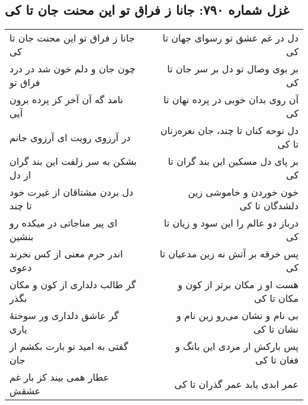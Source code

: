 \begin{center}
\section*{غزل شماره ۷۹۰: جانا ز فراق تو این محنت جان تا کی}
\label{sec:790}
\begin{longtable}{l p{0.5cm} r}
جانا ز فراق تو این محنت جان تا کی
&&
دل در غم عشق تو رسوای جهان تا کی
\\
چون جان و دلم خون شد در درد فراق تو
&&
بر بوی وصال تو دل بر سر جان تا کی
\\
نامد گه آن آخر کز پرده برون آیی
&&
آن روی بدان خوبی در پرده نهان تا کی
\\
در آرزوی رویت ای آرزوی جانم
&&
دل نوحه کنان تا چند، جان نعره‌زنان تا کی
\\
بشکن به سر زلفت این بند گران از دل
&&
بر پای دل مسکین این بند گران تا کی
\\
دل بردن مشتاقان از غیرت خود تا چند
&&
خون خوردن و خاموشی زین دلشدگان تا کی
\\
ای پیر مناجاتی در میکده رو بنشین
&&
درباز دو عالم را این سود و زیان تا کی
\\
اندر حرم معنی از کس نخرند دعوی
&&
پس خرقه بر آتش نه زین مدعیان تا کی
\\
گر طالب دلداری از کون و مکان بگذر
&&
هست او ز مکان برتر از کون و مکان تا کی
\\
گر عاشق دلداری ور سوختهٔ یاری
&&
بی نام و نشان می‌رو زین نام و نشان تا کی
\\
گفتی به امید تو بارت بکشم از جان
&&
پس بارکش ار مردی این بانگ و فغان تا کی
\\
عطار همی بیند کز بار غم عشقش
&&
عمر ابدی یابد عمر گذران تا کی
\\
\end{longtable}
\end{center}
